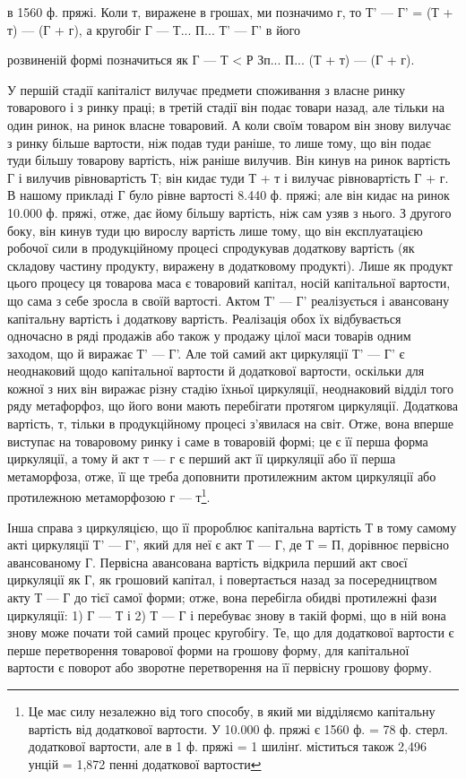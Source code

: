 в 1560 ф. пряжі. Коли т, виражене в грошах, ми позначимо г, то
Т' — Г' = (Т + т) — (Г + г), а кругобіг Г — Т... П... Т' — Г' в його

розвиненій формі позначиться як Г — Т < Р Зп... П... (Т + т) — (Г + г).

У першій стадії капіталіст вилучає предмети споживання з власне
ринку товарового і з ринку праці; в третій стадії він подає товари назад, але
тільки на один ринок, на ринок власне товаровий. А коли своїм товаром
він знову вилучає з ринку більше вартости, ніж подав туди раніше, то
лише тому, що він подає туди більшу товарову вартість, ніж раніше
вилучив. Він кинув на ринок вартість Г і вилучив рівновартість Т; він
кидає туди Т + т і вилучає рівновартість Г + г. В нашому прикладі Г
було рівне вартості 8.440 ф. пряжі; але він кидає на ринок 10.000 ф.
пряжі, отже, дає йому більшу вартість, ніж сам узяв з нього. З другого
боку, він кинув туди цю вирослу вартість лише тому, що він експлуатацією
робочої сили в продукційному процесі спродукував додаткову
вартість (як складову частину продукту, виражену в додатковому продукті).
Лише як продукт цього процесу ця товарова маса є товаровий капітал,
носій капітальної вартости, що сама з себе зросла в своїй вартості. Актом Т' —
Г' реалізується і авансовану капітальну вартість і додаткову вартість. Реалізація
обох їх відбувається одночасно в ряді продажів або також у продажу
цілої маси товарів одним заходом, що й виражає Т' — Г'. Але той самий акт
циркуляції Т' — Г' є неоднаковий щодо капітальної вартости й додаткової вартости,
оскільки для кожної з них він виражає різну стадію їхньої циркуляції,
неоднаковий відділ того ряду метафорфоз, що його вони мають перебігати
протягом циркуляції. Додаткова вартість, т, тільки в продукційному
процесі з’явилася на світ. Отже, вона вперше виступає на товаровому
ринку і саме в товаровій формі; це є її перша форма циркуляції,
а тому й акт т — г є перший акт її циркуляції або її перша метаморфоза,
отже, її ще треба доповнити протилежним актом циркуляції або протилежною
метаморфозою г — т\footnote{
Це має силу незалежно від того способу, в який ми відділяємо капітальну
вартість від додаткової вартости. У 10.000 ф. пряжі є 1560 ф. = 78 ф. стерл. додаткової
вартости, але в 1 ф. пряжі = 1 шилінґ. міститься також 2,496 унцій = 1,872
пенні додаткової вартости
}.

Інша справа з циркуляцією, що її пророблює капітальна вартість Т
в тому самому акті циркуляції Т' — Г', який для неї є акт Т — Г, де
Т = П, дорівнює первісно авансованому Г. Первісна авансована
вартість відкрила перший акт своєї циркуляції як Г, як грошовий капітал,
і повертається назад за посередництвом акту Т — Г до тієї самої форми; отже,
вона перебігла обидві протилежні фази циркуляції: 1) Г — Т і 2) Т — Г
і перебуває знову в такій формі, що в ній вона знову може почати той
самий процес кругобігу. Те, що для додаткової вартости є перше
перетворення товарової форми на грошову форму, для капітальної вартости
є поворот або зворотне перетворення на її первісну грошову
форму.